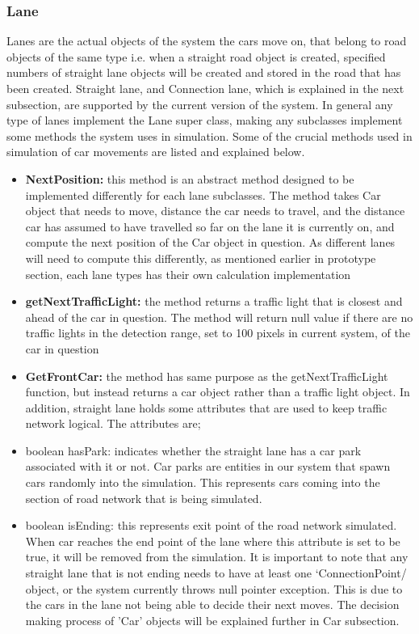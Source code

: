 \documentclass[11pt]{article}
\begin{document}
\subsubsection{Lane}
Lanes are the actual objects of the system the cars move on, that belong to road objects of the same type i.e. when a straight road object is created, specified numbers of straight lane objects will be created and stored in the road that has been created. Straight lane, and Connection lane, which is explained in the next subsection, are supported by the current version of the  system. In general any type of lanes implement the Lane super class, making any subclasses implement some methods the system uses in simulation. Some of the crucial methods used in simulation of car movements are listed and explained below.
\begin{itemize}
\item \textbf{NextPosition:} this method is an abstract method designed to be implemented differently for each lane subclasses. The method takes Car object that needs to move, distance the car needs to travel, and the distance car has assumed to have travelled so far on  the lane it is currently on, and compute the next position of the Car object in question. As different lanes will need to compute this differently, as mentioned earlier in prototype section, each lane types has their own calculation implementation

\item \textbf{getNextTrafficLight:} the method returns a traffic light that is closest and ahead of the car in question. The method will return null value if there are no traffic lights in the detection range, set to 100 pixels in current system, of the car in question

\item \textbf{GetFrontCar:} the method has same purpose as the getNextTrafficLight function, but instead returns a car object rather than a traffic light object.
In addition, straight lane holds some attributes that are used to keep traffic network logical. The attributes are;

\item boolean hasPark: indicates whether the straight lane has a car park associated with it or not. Car parks are entities in our system that spawn cars randomly into the simulation. This represents cars coming into the section of road network that is being simulated. 

\item boolean isEnding: this represents exit point of the road network simulated. When car reaches the end point of the lane where this attribute is set to be true, it will be removed from the simulation. It is important to note that any straight lane that is not ending needs to have at least one `ConnectionPoint/ object, or the system currently throws null pointer exception. This is due to the cars in the lane not being able to decide their next moves. The decision making process of 'Car' objects will be explained further in Car subsection.
\end{itemize}
\end{document}
